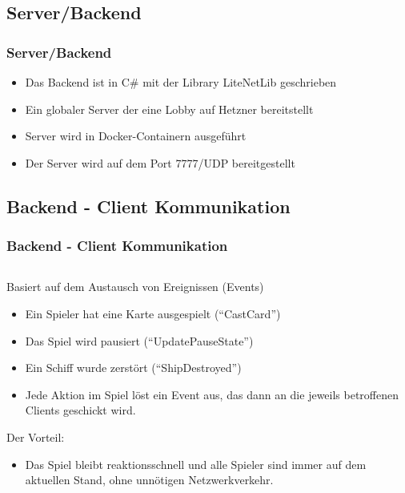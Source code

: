 \documentclass{beamer}
\begin{document}
\subsection{Server/Backend}
\begin{frame}
\frametitle{Server/Backend}
  \begin{itemize}
    \item Das Backend ist in C\# mit der Library LiteNetLib geschrieben
    \item Ein globaler Server der eine Lobby auf Hetzner bereitstellt
    \item Server wird in Docker-Containern ausgeführt
    \item Der Server wird auf dem Port 7777/UDP bereitgestellt
  \end{itemize}
\end{frame}

\subsection{Backend - Client Kommunikation}
\begin{frame}
\frametitle{Backend - Client Kommunikation}
\begin{columns}
  \begin{column}{0.85\textwidth}
    Basiert auf dem Austausch von Ereignissen (Events)
    \begin{itemize}
      \item Ein Spieler hat eine Karte ausgespielt (``CastCard'')
      \item Das Spiel wird pausiert (``UpdatePauseState'')
      \item Ein Schiff wurde zerstört (``ShipDestroyed'')
      \item Jede Aktion im Spiel löst ein Event aus, das dann an die jeweils betroffenen Clients geschickt wird.
    \end{itemize}
    
    Der Vorteil:
    \begin{itemize}
      \item Das Spiel bleibt reaktionsschnell und alle Spieler sind immer auf dem aktuellen Stand, ohne unnötigen Netzwerkverkehr.
    \end{itemize}
  \end{column}
\end{columns}
\end{frame}
\end{document}
